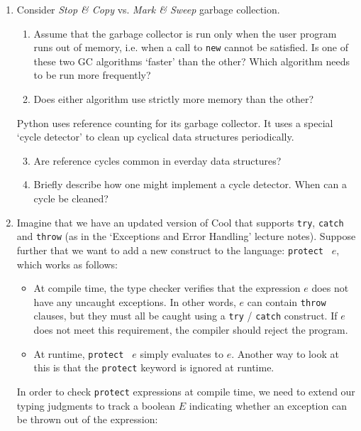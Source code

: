 \documentclass[12pt]{article} \usepackage{color} \usepackage{amsmath} \usepackage{amssymb}
\begin{document}
\begin{enumerate}
\item{Consider \emph{Stop \&{} Copy} vs. \emph{Mark \&{} Sweep} garbage collection.
\begin{enumerate}
\item{Assume that the garbage collector is run only when the user
program runs out of memory, i.e. when a call to \texttt{new} cannot be
satisfied. Is one of these two GC algorithms `faster' than the other?
Which algorithm needs to be run more frequently?}
\item{Does either algorithm use strictly more memory than the other? \\}
\end{enumerate}


Python uses reference counting for its garbage collector. It uses a
special `cycle detector' to clean up cyclical data structures
periodically.
\begin{enumerate}
\setcounter{enumii}{2}
\item{Are reference cycles common in everday data structures?}
\item{Briefly describe how one might implement a cycle detector. When
can a cycle be cleaned?}
\end{enumerate}
}

\item{ Imagine that we have an updated version of Cool that supports
\texttt{try}, \texttt{catch} and \texttt{throw} (as in the `Exceptions
and Error Handling' lecture notes). Suppose further that we want to
add a new construct to the language: \texttt{protect } $e$, which
works as follows:

\begin{itemize}
\item{At compile time, the type checker verifies that the expression
$e$ does not have any uncaught exceptions. In other words, $e$ can
contain \texttt{throw} clauses, but they must all be caught using a
\texttt{try} / \texttt{catch} construct. If $e$ does not meet this
requirement, the compiler should reject the program.}
\item{At runtime, \texttt{protect } $e$ simply evaluates to
$e$. Another way to look at this is that the \texttt{protect} keyword
is ignored at runtime.}
\end{itemize}

In order to check \texttt{protect} expressions at compile time, we
need to extend our typing judgments to track a boolean $E$ indicating
whether an exception can be thrown out of the expression:

}
\end{enumerate}
\end{document}
